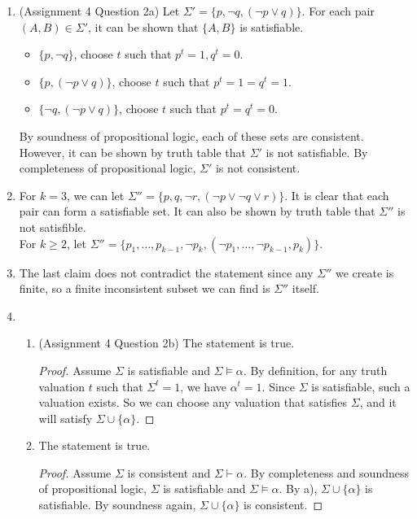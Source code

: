 \documentclass[12pt]{article}
\begin{document}
\begin{enumerate}
    \item (Assignment 4 Question 2a) Let $\Sigma'=\{p,\neg q, (\neg p\lor q)\}$. For each pair $(A,B)\in\Sigma'$, it can be shown that $\{A,B\}$ is satisfiable.
    \begin{itemize}
        \item $\{p,\neg q\}$, choose $t$ such that $p^t=1, q^t=0$.
        \item $\{p,(\neg p\lor q)\}$, choose $t$ such that $p^t=1=q^t=1$.
        \item $\{\neg q,(\neg p\lor q)\}$, choose $t$ such that $p^t=q^t=0$.
    \end{itemize}
    By soundness of propositional logic, each of these sets are consistent.\\
    However, it can be shown by truth table that $\Sigma'$ is not satisfiable. By completeness of propositional logic, $\Sigma'$ is not consistent.
    \item For $k=3$, we can let $\Sigma''=\{p,q,\neg r, (\neg p\lor \neg q\lor r)\}$. It is clear that each pair can form a satisfiable set. It can also be shown by truth table that $\Sigma''$ is not satisfible.\\
        For $k\geq 2$, let $\Sigma''=\{p_1,\dots, p_{k-1},\neg p_k, (\neg p_1,\dots,\neg p_{k-1}, p_k)\}$.
    \item The last claim does not contradict the statement since any $\Sigma''$ we create is finite, so a finite inconsistent subset we can find is $\Sigma''$ itself.
    \item 
    \begin{enumerate}
        \item (Assignment 4 Question 2b) The statement is true.
        \begin{proof}
            Assume $\Sigma$ is satisfiable and $\Sigma\models\alpha$. By definition, for any truth valuation $t$ such that $\Sigma^t=1$, we have $\alpha^t=1$. Since $\Sigma$ is satisfiable, such a valuation exists. So we can choose any valuation that satisfies $\Sigma$, and it will satisfy $\Sigma\cup\{\alpha\}$.
        \end{proof}
        \item The statement is true.
        \begin{proof}
            Assume $\Sigma$ is consistent and $\Sigma\vdash\alpha$. By completeness and soundness of propositional logic, $\Sigma$ is satisfiable and $\Sigma\models\alpha$. By a), $\Sigma\cup\{\alpha\}$ is satisfiable. By soundness again, $\Sigma\cup\{\alpha\}$ is consistent.
        \end{proof}
    \end{enumerate}
\end{enumerate}
\end{document}
